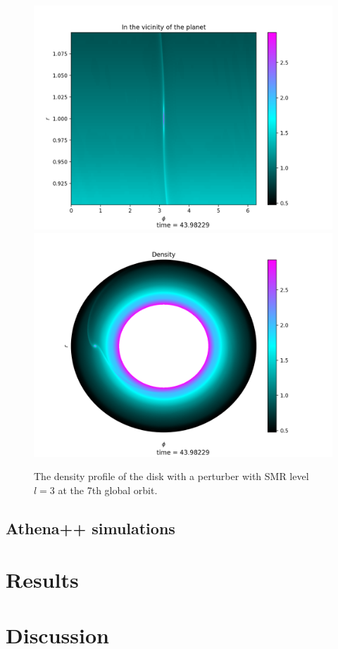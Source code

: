 \documentclass[twocolumn]{aastex631}
\begin{document}
\begin{figure}
\centering
	\includegraphics[width=0.48\columnwidth]{smr3zoomeddisk.png}
	\includegraphics[width=0.48\columnwidth]{smr3disk.png}
    \caption{The density profile of the disk with a perturber with SMR level $l=3$ at the 7th global orbit.}
    \label{fig:den_smr3}
\end{figure}





\subsection{Athena++ simulations}

\section{Results}
\label{sec:results}

\section{Discussion} 
\label{sec:conclusion}


\end{document}
